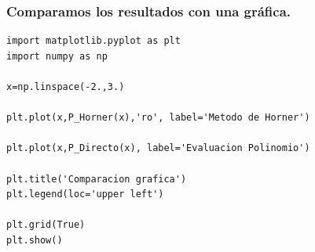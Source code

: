 \begin{frame}[fragile]
\frametitle{Comparamos los resultados con una gráfica.}
\fontsize{14}{14}\selectfont
\begin{lstlisting}[basicstyle=\ttfamily\small, columns=fullflexible]
import matplotlib.pyplot as plt
import numpy as np

x=np.linspace(-2.,3.)

plt.plot(x,P_Horner(x),'ro', label='Metodo de Horner')

plt.plot(x,P_Directo(x), label='Evaluacion Polinomio')

plt.title('Comparacion grafica')
plt.legend(loc='upper left')

plt.grid(True)
plt.show()
\end{lstlisting}
\end{frame}


